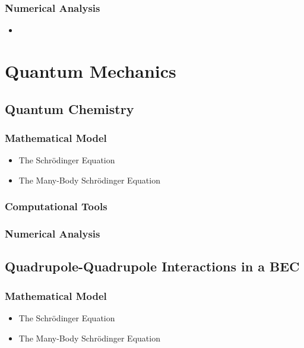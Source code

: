 \documentclass{report}
\begin{document}
        \subsection{Numerical Analysis}

            \begin{itemize}
                \item 
            \end{itemize}

\chapter{Quantum Mechanics} \label{sec:quantum}

    \section{Quantum Chemistry}

        \subsection{Mathematical Model}

            \begin{itemize}
                \item The Schr{\"o}dinger Equation
                \item The Many-Body Schr{\"o}dinger Equation
            \end{itemize}

        \subsection{Computational Tools}

        \subsection{Numerical Analysis}

    \section{Quadrupole-Quadrupole Interactions in a BEC}

        \subsection{Mathematical Model}

            \begin{itemize}
                \item The Schr{\"o}dinger Equation
                \item The Many-Body Schr{\"o}dinger Equation
            \end{itemize}
\end{document}
